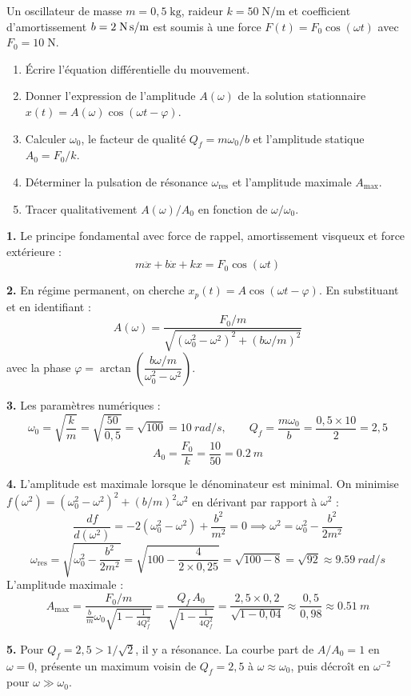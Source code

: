 \documentclass[12pt,a4paper]{article}
\begin{document}
\begin{boiteexercice}
Un oscillateur de masse $m=0{,}5\;\text{kg}$, raideur $k=50\;\text{N/m}$ et coefficient d'amortissement $b=2\;\text{N\,s/m}$ est soumis à une force $F(t)=F_0\cos(\omega t)$ avec $F_0=10\;\text{N}$.
\begin{enumerate}
  \item Écrire l'équation différentielle du mouvement.
  \item Donner l'expression de l'amplitude $A(\omega)$ de la solution stationnaire $x(t)=A(\omega)\cos(\omega t-\varphi)$.
  \item Calculer $\omega_0$, le facteur de qualité $Q_f=m\omega_0/b$ et l'amplitude statique $A_0=F_0/k$.
  \item Déterminer la pulsation de résonance $\omega_\text{res}$ et l'amplitude maximale $A_\text{max}$.
  \item Tracer qualitativement $A(\omega)/A_0$ en fonction de $\omega/\omega_0$.
\end{enumerate}
\end{boiteexercice}

\begin{boitecorrige}
\textbf{1.} Le principe fondamental avec force de rappel, amortissement visqueux et force extérieure :
\[
m\ddot{x} + b\dot{x} + kx = F_0\cos(\omega t)
\]

\textbf{2.} En régime permanent, on cherche $x_p(t)=A\cos(\omega t-\varphi)$. En substituant et en identifiant :
\[
\boxed{A(\omega) = \frac{F_0/m}{\sqrt{(\omega_0^2-\omega^2)^2+(b\omega/m)^2}}}
\]
avec la phase $\varphi = \arctan\!\left(\dfrac{b\omega/m}{\omega_0^2-\omega^2}\right)$.

\textbf{3.} Les paramètres numériques :
\[
\omega_0 = \sqrt{\frac{k}{m}} = \sqrt{\frac{50}{0{,}5}} = \sqrt{100} = \qty{10}{rad/s}, \qquad Q_f = \frac{m\omega_0}{b} = \frac{0{,}5\times10}{2} = 2{,}5
\]
\[
A_0 = \frac{F_0}{k} = \frac{10}{50} = \qty{0.2}{m}
\]

\textbf{4.} L'amplitude est maximale lorsque le dénominateur est minimal. On minimise $f(\omega^2)=(\omega_0^2-\omega^2)^2+(b/m)^2\omega^2$ en dérivant par rapport à $\omega^2$ :
\[
\frac{d f}{d(\omega^2)} = -2(\omega_0^2-\omega^2) + \frac{b^2}{m^2} = 0 \implies \omega^2 = \omega_0^2 - \frac{b^2}{2m^2}
\]
\[
\omega_\text{res} = \sqrt{\omega_0^2 - \frac{b^2}{2m^2}} = \sqrt{100 - \frac{4}{2\times0{,}25}} = \sqrt{100-8} = \sqrt{92} \approx \qty{9.59}{rad/s}
\]
L'amplitude maximale :
\[
A_\text{max} = \frac{F_0/m}{\frac{b}{m}\omega_0\sqrt{1 - \frac{1}{4Q_f^2}}} = \frac{Q_f \,A_0}{\sqrt{1-\frac{1}{4Q_f^2}}} = \frac{2{,}5\times0{,}2}{\sqrt{1-0{,}04}} \approx \frac{0{,}5}{0{,}98} \approx \qty{0.51}{m}
\]

\textbf{5.} Pour $Q_f=2{,}5>1/\sqrt{2}$, il y a résonance. La courbe part de $A/A_0=1$ en $\omega=0$, présente un maximum voisin de $Q_f=2{,}5$ à $\omega\approx\omega_0$, puis décroît en $\omega^{-2}$ pour $\omega\gg\omega_0$.
\end{boitecorrige}
\end{document}
